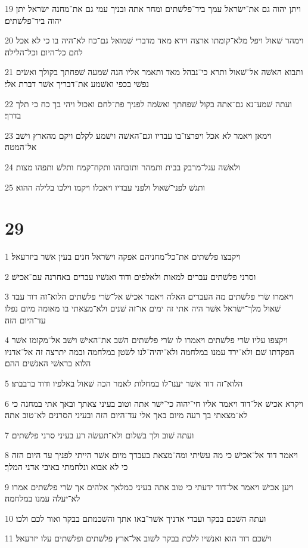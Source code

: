 \par 19 ויתן יהוה גם את־ישׂראל עמך ביד־פלשׁתים ומחר אתה ובניך עמי גם את־מחנה ישׂראל יתן יהוה ביד־פלשׁתים׃
\par 20 וימהר שׁאול ויפל מלא־קומתו ארצה וירא מאד מדברי שׁמואל גם־כח לא־היה בו כי לא אכל לחם כל־היום וכל־הלילה׃
\par 21 ותבוא האשׁה אל־שׁאול ותרא כי־נבהל מאד ותאמר אליו הנה שׁמעה שׁפחתך בקולך ואשׂים נפשׁי בכפי ואשׁמע את־דבריך אשׁר דברת אלי׃
\par 22 ועתה שׁמע־נא גם־אתה בקול שׁפחתך ואשׂמה לפניך פת־לחם ואכול ויהי בך כח כי תלך בדרך׃
\par 23 וימאן ויאמר לא אכל ויפרצו־בו עבדיו וגם־האשׁה וישׁמע לקלם ויקם מהארץ וישׁב אל־המטה׃
\par 24 ולאשׁה עגל־מרבק בבית ותמהר ותזבחהו ותקח־קמח ותלשׁ ותפהו מצות׃
\par 25 ותגשׁ לפני־שׁאול ולפני עבדיו ויאכלו ויקמו וילכו בלילה ההוא׃

\chapter{29}

\par 1 ויקבצו פלשׁתים את־כל־מחניהם אפקה וישׂראל חנים בעין אשׁר ביזרעאל׃
\par 2 וסרני פלשׁתים עברים למאות ולאלפים ודוד ואנשׁיו עברים באחרנה עם־אכישׁ׃
\par 3 ויאמרו שׂרי פלשׁתים מה העברים האלה ויאמר אכישׁ אל־שׂרי פלשׁתים הלוא־זה דוד עבד שׁאול מלך־ישׂראל אשׁר היה אתי זה ימים או־זה שׁנים ולא־מצאתי בו מאומה מיום נפלו עד־היום הזה׃
\par 4 ויקצפו עליו שׂרי פלשׁתים ויאמרו לו שׂרי פלשׁתים השׁב את־האישׁ וישׁב אל־מקומו אשׁר הפקדתו שׁם ולא־ירד עמנו במלחמה ולא־יהיה־לנו לשׂטן במלחמה ובמה יתרצה זה אל־אדניו הלוא בראשׁי האנשׁים ההם׃
\par 5 הלוא־זה דוד אשׁר יענו־לו במחלות לאמר הכה שׁאול באלפיו ודוד ברבבתו׃
\par 6 ויקרא אכישׁ אל־דוד ויאמר אליו חי־יהוה כי־ישׁר אתה וטוב בעיני צאתך ובאך אתי במחנה כי לא־מצאתי בך רעה מיום באך אלי עד־היום הזה ובעיני הסרנים לא־טוב אתה׃
\par 7 ועתה שׁוב ולך בשׁלום ולא־תעשׂה רע בעיני סרני פלשׁתים׃
\par 8 ויאמר דוד אל־אכישׁ כי מה עשׂיתי ומה־מצאת בעבדך מיום אשׁר הייתי לפניך עד היום הזה כי לא אבוא ונלחמתי באיבי אדני המלך׃
\par 9 ויען אכישׁ ויאמר אל־דוד ידעתי כי טוב אתה בעיני כמלאך אלהים אך שׂרי פלשׁתים אמרו לא־יעלה עמנו במלחמה׃
\par 10 ועתה השׁכם בבקר ועבדי אדניך אשׁר־באו אתך והשׁכמתם בבקר ואור לכם ולכו׃
\par 11 וישׁכם דוד הוא ואנשׁיו ללכת בבקר לשׁוב אל־ארץ פלשׁתים ופלשׁתים עלו יזרעאל׃

